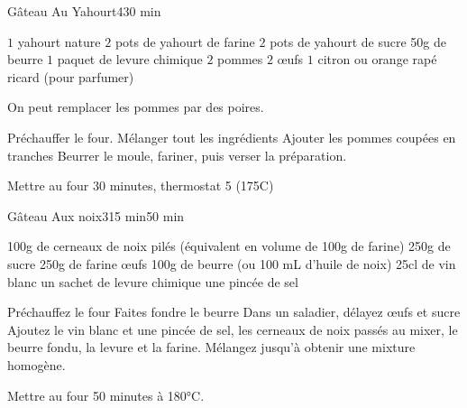 \begin{recette}{Gâteau Au Yahourt}{4}{}{30 min}

\begin{ingredients}
\ingredient $1$ yahourt nature
\ingredient $2$ pots de yahourt de farine
\ingredient $2$ pots de yahourt de sucre
\ingredient 50g de beurre
\ingredient $1$ paquet de levure chimique
\ingredient $2$ pommes
\ingredient $2$ œufs
\ingredient $1$ citron ou orange rapé
\ingredient ricard (pour parfumer)
\end{ingredients}

\begin{remarque}
On peut remplacer les pommes par des poires.
\end{remarque}

\begin{preparation}
\etape Préchauffer le four.
\etape Mélanger tout les ingrédients
\etape Ajouter les pommes coupées en tranches
\etape Beurrer le moule, fariner, puis verser la préparation.
\end{preparation}

\begin{cuisson}
Mettre au four 30 minutes, thermostat 5 (175\degres C)
\end{cuisson}
\end{recette}

\begin{recette}{Gâteau Aux noix}{3}{15 min}{50 min}

\begin{ingredients}
\ingredient 100g de cerneaux de noix pilés (équivalent en volume de 100g de farine)
\ingredient 250g de sucre
\ingredient 250g de farine
 œufs
\ingredient 100g de beurre (ou 100 mL d'huile de noix)
\ingredient 25cl de vin blanc
\ingredient un sachet de levure chimique
\ingredient une pincée de sel
\end{ingredients}

\begin{preparation}
\etape Préchauffez le four
\etape Faites fondre le beurre
\etape Dans un saladier, délayez œufs et sucre
\etape Ajoutez le vin blanc et une pincée de sel, les cerneaux de noix passés au mixer, le beurre fondu, la levure et la farine. 
\etape Mélangez jusqu'à obtenir une mixture homogène. 
\end{preparation}

\begin{cuisson}
Mettre au four 50 minutes à 180°C.
\end{cuisson}
\end{recette}

